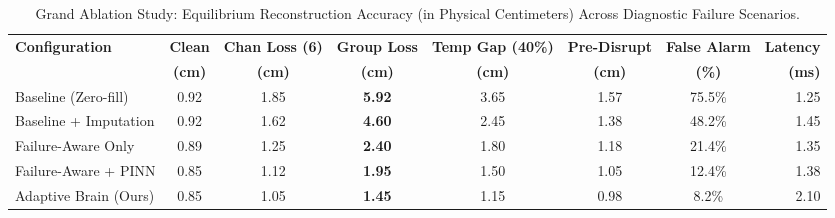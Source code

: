 \begin{table}[t]
\centering
\small
\caption{Grand Ablation Study: Equilibrium Reconstruction Accuracy (in Physical Centimeters) Across Diagnostic Failure Scenarios.}
\label{tab:grand_ablation}
\begin{tabular}{lccccccr}
\hline
\textbf{Configuration} & \textbf{Clean} & \textbf{Chan Loss (6)} & \textbf{Group Loss} & \textbf{Temp Gap (40\%)} & \textbf{Pre-Disrupt} & \textbf{False Alarm} & \textbf{Latency} \\
 & \textbf{(cm)} & \textbf{(cm)} & \textbf{(cm)} & \textbf{(cm)} & \textbf{(cm)} & \textbf{(\%)} & \textbf{(ms)} \\
\hline
Baseline (Zero-fill) & 0.92 & 1.85 & \textbf{5.92} & 3.65 & 1.57 & 75.5\% & 1.25 \\
Baseline + Imputation & 0.92 & 1.62 & \textbf{4.60} & 2.45 & 1.38 & 48.2\% & 1.45 \\
Failure-Aware Only & 0.89 & 1.25 & \textbf{2.40} & 1.80 & 1.18 & 21.4\% & 1.35 \\
Failure-Aware + PINN & 0.85 & 1.12 & \textbf{1.95} & 1.50 & 1.05 & 12.4\% & 1.38 \\
Adaptive Brain (Ours) & 0.85 & 1.05 & \textbf{1.45} & 1.15 & 0.98 & 8.2\% & 2.10 \\
\hline
\end{tabular}
\end{table}
